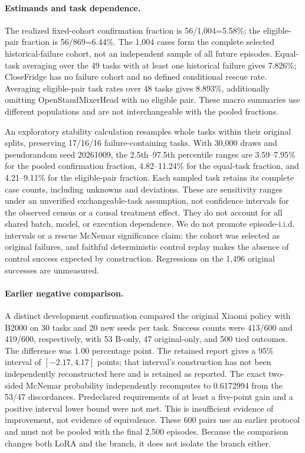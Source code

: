 \paragraph{Estimands and task dependence.}
The realized fixed-cohort confirmation fraction is 56/1,004=5.58\%; the eligible-pair fraction is 56/869=6.44\%. The 1,004 cases form the complete selected historical-failure cohort, not an independent sample of all future episodes. Equal-task averaging over the 49 tasks with at least one historical failure gives 7.826\%; CloseFridge has no failure cohort and no defined conditional rescue rate. Averaging eligible-pair task rates over 48 tasks gives 8.893\%, additionally omitting OpenStandMixerHead with no eligible pair. These macro summaries use different populations and are not interchangeable with the pooled fractions.

An exploratory stability calculation resamples whole tasks within their original splits, preserving 17/16/16 failure-containing tasks. With 30,000 draws and pseudorandom seed 20261009, the 2.5th--97.5th percentile ranges are 3.59--7.95\% for the pooled confirmation fraction, 4.82--11.24\% for the equal-task fraction, and 4.21--9.11\% for the eligible-pair fraction. Each sampled task retains its complete case counts, including unknowns and deviations. These are sensitivity ranges under an unverified exchangeable-task assumption, not confidence intervals for the observed census or a causal treatment effect. They do not account for all shared batch, model, or execution dependence. We do not promote episode-i.i.d. intervals or a rescue McNemar significance claim: the cohort was selected as original failures, and faithful deterministic control replay makes the absence of control success expected by construction. Regressions on the 1,496 original successes are unmeasured.

\paragraph{Earlier negative comparison.}
A distinct development confirmation compared the original Xiaomi policy with B2000 on 30 tasks and 20 new seeds per task. Success counts were 413/600 and 419/600, respectively, with 53 B-only, 47 original-only, and 500 tied outcomes. The difference was 1.00 percentage point. The retained report gives a 95\% interval of $[-2.17,4.17]$ points; that interval's construction has not been independently reconstructed here and is retained as reported. The exact two-sided McNemar probability independently recomputes to 0.6172994 from the 53/47 discordances. Predeclared requirements of at least a five-point gain and a positive interval lower bound were not met. This is insufficient evidence of improvement, not evidence of equivalence. These 600 pairs use an earlier protocol and must not be pooled with the final 2,500 episodes. Because the comparison changes both LoRA and the branch, it does not isolate the branch either.

